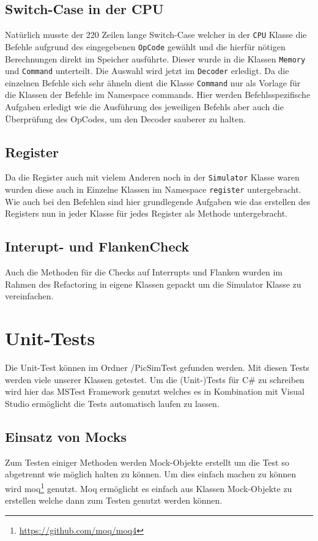 \documentclass[12pt,a4paper,titlepage,ngerman,pdftex]{report}
\begin{document}
    \subsection{Switch-Case in der CPU}
    Natürlich musste der 220 Zeilen lange Switch-Case welcher in der \verb|CPU| Klasse die Befehle aufgrund des eingegebenen \verb|OpCode| 
    gewählt und die hierfür nötigen Berechnungen direkt im Speicher ausführte.
    Dieser wurde in die Klassen \verb|Memory| und \verb|Command| unterteilt. Die Auswahl wird jetzt im \verb|Decoder| erledigt.
    Da die einzelnen Befehle sich sehr ähneln dient die Klasse \verb|Command| nur als Vorlage für die Klassen der Befehle im Namespace commands.
    Hier werden Befehlsspezifische Aufgaben erledigt wie die Ausführung des jeweiligen Befehls aber auch die Überprüfung des OpCodes, um den Decoder sauberer zu halten.
    \subsection{Register}
    Da die Register auch mit vielem Anderen noch in der \verb|Simulator| Klasse  waren wurden diese auch in Einzelne Klassen im Namespace \verb|register| untergebracht. 
    Wie auch bei den Befehlen sind hier grundlegende Aufgaben wie das erstellen des Registers nun in jeder Klasse für jedes Register als Methode untergebracht.
    \subsection{Interupt- und FlankenCheck}
   Auch die Methoden für die Checks auf Interrupts und Flanken wurden im Rahmen des Refactoring in eigene Klassen gepackt um die Simulator Klasse zu vereinfachen.
   
   
   \section{Unit-Tests}
    Die Unit-Test können im Ordner /PicSimTest gefunden werden. 
	Mit diesen Tests werden viele unserer Klassen getestet.
	Um die (Unit-)Tests für C\# zu schreiben wird hier das MSTest Framework genutzt welches es in Kombination mit Visual Studio ermöglicht die Tests automatisch laufen zu lassen.

    \subsection{Einsatz von Mocks}
    Zum Testen einiger Methoden werden Mock-Objekte erstellt um die Test so abgetrennt wie möglich halten zu können.
	Um dies einfach machen zu können wird moq\footnote{\url{https://github.com/moq/moq4}} genutzt.
	Moq ermöglicht es einfach aus Klassen Mock-Objekte zu erstellen welche dann zum Testen genutzt werden können.
	
\end{document}

